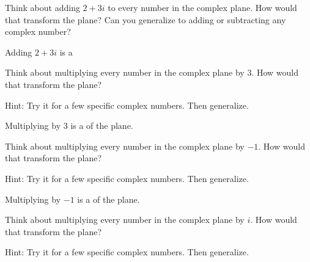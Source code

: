 \documentclass{ximera}
\begin{document}
\begin{question}
Think about adding $2+3i$ to every number in the complex plane.  How would that transform the plane?  Can you generalize to adding or subtracting any complex number? 

\begin{solution}
Adding $2+3i$ is a 
\end{solution}
 
\end{question}

\begin{question}
Think about multiplying every number in the complex plane by $3$.  How would that transform the plane?  

Hint: Try it for a few specific complex numbers.  Then generalize.  

\begin{solution}
Multiplying by $3$ is a  of the plane.  
\end{solution}

\end{question}

\begin{question}
Think about multiplying every number in the complex plane by $-1$.  How would that transform the plane?  

Hint: Try it for a few specific complex numbers.  Then generalize.  
\begin{solution}
Multiplying by $-1$ is a  of the plane.  
\end{solution}

\end{question}

\begin{question}
Think about multiplying every number in the complex plane by $i$.  How would that transform the plane?  

Hint: Try it for a few specific complex numbers.  Then generalize.  
\begin{freeResponse}
\end{freeResponse}

\end{question}
\end{document}
